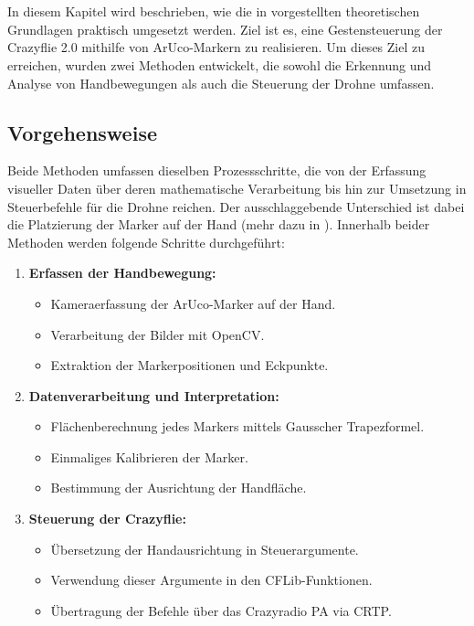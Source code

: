 \chapter{\chapThree}
\label{cha:chapter3} %

\begingroup
\fontsize{12pt}{14pt}\selectfont

In diesem Kapitel wird beschrieben, wie die in  vorgestellten theoretischen Grundlagen praktisch umgesetzt werden.
Ziel ist es, eine Gestensteuerung der Crazyflie 2.0 mithilfe von ArUco-Markern zu realisieren.
Um dieses Ziel zu erreichen, wurden zwei Methoden entwickelt, die sowohl die Erkennung und Analyse von Handbewegungen als auch die Steuerung der Drohne umfassen.

\section{Vorgehensweise}

Beide Methoden umfassen dieselben Prozessschritte, die von der Erfassung visueller Daten über deren mathematische Verarbeitung bis hin zur Umsetzung in Steuerbefehle für die Drohne reichen.
Der ausschlaggebende Unterschied ist dabei die Platzierung der Marker auf der Hand (mehr dazu in ).
Innerhalb beider Methoden werden folgende Schritte durchgeführt:

\begin{enumerate}
    \item \textbf{Erfassen der Handbewegung:}
    \begin{itemize}
        \item Kameraerfassung der ArUco-Marker auf der Hand.
        \item Verarbeitung der Bilder mit OpenCV.
        \item Extraktion der Markerpositionen und Eckpunkte.
    \end{itemize}
    \item \textbf{Datenverarbeitung und Interpretation:}
    \begin{itemize}
        \item Flächenberechnung jedes Markers mittels Gausscher Trapezformel.
        \item Einmaliges Kalibrieren der Marker.
        \item Bestimmung der Ausrichtung der Handfläche.
    \end{itemize}
    \item \textbf{Steuerung der Crazyflie:}
    \begin{itemize}
        \item Übersetzung der Handausrichtung in Steuerargumente.
        \item Verwendung dieser Argumente in den CFLib-Funktionen.
        \item Übertragung der Befehle über das Crazyradio PA via CRTP.
    \end{itemize}
\end{enumerate}

